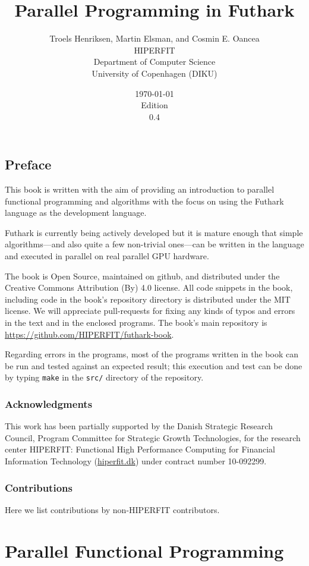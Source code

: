 \documentclass[oneside,11pt]{book}
\title{\bf Parallel Programming in Futhark}
\author{Troels Henriksen, Martin Elsman, and Cosmin E. Oancea \\[2mm] HIPERFIT \\[2mm] Department of Computer Science \\ University of Copenhagen (DIKU)}
\date{\today \\[5mm] Edition \\ 0.4}
\begin{document}
\frontmatter
\maketitle
\chapter{Preface}

This book is written with the aim of providing an introduction to
parallel functional programming and algorithms with the focus on using
the Futhark language as the development language.

Futhark is currently being actively developed but it is mature enough
that simple algorithms---and also quite a few non-trivial ones---can
be written in the language and executed in parallel on real parallel
GPU hardware.

The book is Open Source, maintained on github, and distributed under
the Creative Commons Attribution (By) 4.0 license. All code snippets
in the book, including code in the book's repository directory is
distributed under the MIT license. We will appreciate pull-requests
for fixing any kinds of typos and errors in the text and in the
enclosed programs. The book's main repository is \url{https://github.com/HIPERFIT/futhark-book}.

Regarding errors in the programs, most of the
programs written in the book can be run and tested against an expected
result; this execution and test can be done by typing \texttt{make} in
the \texttt{src/} directory of the repository.

\section*{Acknowledgments}
This work has been partially supported by the Danish Strategic Research
Council, Program Committee for Strategic Growth Technologies, for the
research center HIPERFIT: Functional High Performance Computing for
Financial Information Technology (\url{hiperfit.dk}) under contract number
10-092299.

\section*{Contributions}
Here we list contributions by non-HIPERFIT contributors.


\tableofcontents
\mainmatter
\part{Parallel Functional Programming}
\end{document}
